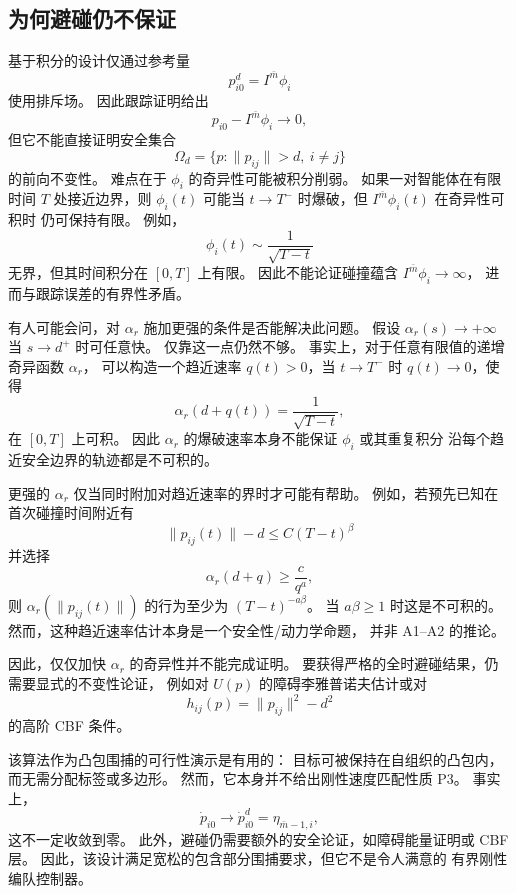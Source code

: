 \subsection{为何避碰仍不保证}

基于积分的设计仅通过参考量
\[
    p_{i0}^{d}=I^{\bar m}\phi_i
\]
使用排斥场。
因此跟踪证明给出
\[
    p_{i0}-I^{\bar m}\phi_i\to0,
\]
但它不能直接证明安全集合
\[
    \Omega_d=\{p:\|p_{ij}\|>d,\ i\ne j\}
\]
的前向不变性。
难点在于 $\phi_i$ 的奇异性可能被积分削弱。
如果一对智能体在有限时间 $T$ 处接近边界，则 $\phi_i(t)$ 可能当
$t\to T^-$ 时爆破，但 $I^{\bar m}\phi_i(t)$ 在奇异性可积时
仍可保持有限。
例如，
\[
    \phi_i(t)\sim\frac{1}{\sqrt{T-t}}
\]
无界，但其时间积分在 $[0,T]$ 上有限。
因此不能论证碰撞蕴含 $I^{\bar m}\phi_i\to\infty$，
进而与跟踪误差的有界性矛盾。

有人可能会问，对 $\alpha_r$ 施加更强的条件是否能解决此问题。
假设 $\alpha_r(s)\to+\infty$ 当 $s\to d^+$ 时可任意快。
仅靠这一点仍然不够。
事实上，对于任意有限值的递增奇异函数 $\alpha_r$，
可以构造一个趋近速率 $q(t)>0$，当 $t\to T^-$ 时 $q(t)\to0$，使得
\[
    \alpha_r(d+q(t))=\frac{1}{\sqrt{T-t}},
\]
在 $[0,T]$ 上可积。
因此 $\alpha_r$ 的爆破速率本身不能保证 $\phi_i$ 或其重复积分
沿每个趋近安全边界的轨迹都是不可积的。

更强的 $\alpha_r$ 仅当同时附加对趋近速率的界时才可能有帮助。
例如，若预先已知在首次碰撞时间附近有
\[
    \|p_{ij}(t)\|-d\le C(T-t)^\beta
\]
并选择
\[
    \alpha_r(d+q)\ge \frac{c}{q^a},
\]
则 $\alpha_r(\|p_{ij}(t)\|)$ 的行为至少为
$(T-t)^{-a\beta}$。
当 $a\beta\ge1$ 时这是不可积的。
然而，这种趋近速率估计本身是一个安全性/动力学命题，
并非 A1--A2 的推论。

因此，仅仅加快 $\alpha_r$ 的奇异性并不能完成证明。
要获得严格的全时避碰结果，仍需要显式的不变性论证，
例如对 $U(p)$ 的障碍李雅普诺夫估计或对
\[
    h_{ij}(p)=\|p_{ij}\|^2-d^2
\]
的高阶 CBF 条件。

\begin{remark}
该算法作为凸包围捕的可行性演示是有用的：
目标可被保持在自组织的凸包内，而无需分配标签或多边形。
然而，它本身并不给出刚性速度匹配性质 P3。
事实上，
\[
    \dot p_{i0}\to\dot p_{i0}^{d}=\eta_{\bar m-1,i},
\]
这不一定收敛到零。
此外，避碰仍需要额外的安全论证，如障碍能量证明或 CBF 层。
因此，该设计满足宽松的包含部分围捕要求，但它不是令人满意的
有界刚性编队控制器。
\end{remark}
